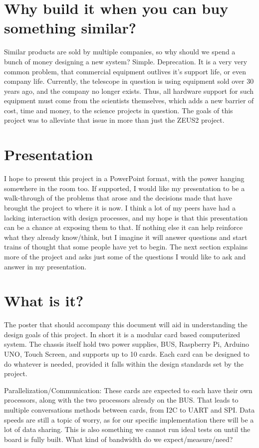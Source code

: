 \documentclass[prb,preprint]{revtex4-1}
\begin{document}
\section{Why build it when you can buy something similar?}
Similar products are sold by multiple companies, so why should we spend a bunch of money designing a new system? Simple. Deprecation. It is a very very common problem, that commercial equipment outlives it's support life, or even company life. Currently, the telescope in question is using equipment sold over 30 years ago, and the company no longer exists. Thus, all hardware support for such equipment must come from the scientists themselves, which adds a new barrier of cost, time and money, to the science projects in question. The goals of this project was to alleviate that issue in more than just the ZEUS2 project. 

\section{Presentation}
I hope to present this project in a PowerPoint format, with the power hanging somewhere in the room too. If supported, I would like my presentation to be a walk-through of the problems that arose and the decisions made that have brought the project to where it is now. I think a lot of my peers have had a lacking interaction with design processes, and my hope is that this presentation can be a chance at exposing them to that. If nothing else it can help reinforce what they already know/think, but I imagine it will answer questions and start trains of thought that some people have yet to begin. The next section explains more of the project and asks just some of the questions I would like to ask and answer in my presentation.

\section{What is it?}
The poster that should accompany this document will aid in understanding the design goals of this project. In short it is a modular card based computerized system. The chassis itself hold two power supplies, BUS, Raspberry Pi, Arduino UNO, Touch Screen, and supports up to 10 cards. Each card can be designed to do whatever is needed, provided it falls within the design standards set by the project. 


Parallelization/Communication: These cards are expected to each have their own processors, along with the two processors already on the BUS. That leads to multiple conversations methods between cards, from I2C to UART and SPI. Data speeds are still a topic of worry, as for our specific implementation there will be a lot of data sharing. This is also something we cannot run ideal tests on until the board is fully built. What kind of bandwidth do we expect/measure/need?
\end{document}
